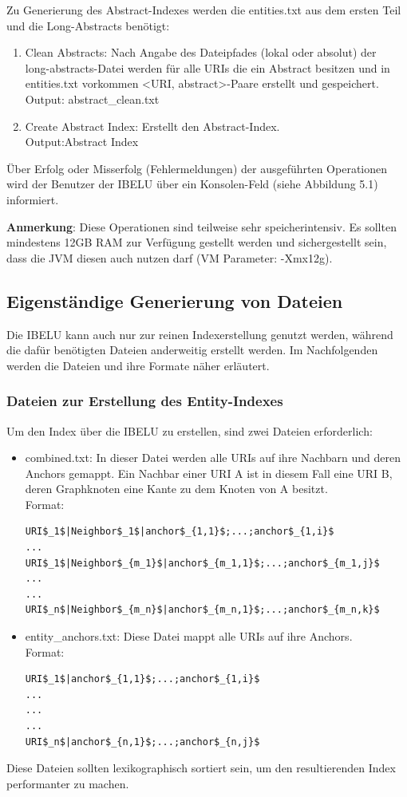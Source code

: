 \documentclass[11pt, a4paper, oneside]{Thesis} %
\begin{document}
Zu Generierung des Abstract-Indexes werden die entities.txt aus dem ersten Teil und die Long-Abstracts ben\"otigt:
\begin{enumerate}
\item Clean Abstracts: Nach Angabe des Dateipfades (lokal oder absolut) der\\ long-abstracts-Datei werden f\"ur alle URIs die ein Abstract besitzen und in entities.txt vorkommen \textless URI, abstract\textgreater-Paare erstellt und gespeichert.\\
Output: abstract\_clean.txt
\item Create Abstract Index: Erstellt den Abstract-Index.\\
Output:Abstract Index
\end{enumerate}
\"Uber Erfolg oder Misserfolg (Fehlermeldungen) der ausgef\"uhrten Operationen wird der Benutzer der IBELU \"uber ein Konsolen-Feld (siehe Abbildung 5.1) informiert.

\textbf{Anmerkung}: Diese Operationen sind teilweise sehr speicherintensiv. Es sollten mindestens 12GB RAM zur Verf\"ugung gestellt werden und sichergestellt sein, dass die JVM diesen auch nutzen darf (VM Parameter: -Xmx12g).


\subsection{Eigenst\"andige Generierung von Dateien}
Die IBELU kann auch nur zur reinen Indexerstellung genutzt werden, w\"ahrend die daf\"ur ben\"otigten Dateien anderweitig erstellt werden. Im Nachfolgenden werden die Dateien und ihre Formate n\"aher erl\"autert.
\subsubsection*{Dateien zur Erstellung des Entity-Indexes}
Um den Index \"uber die IBELU zu erstellen, sind zwei Dateien erforderlich:
\begin{itemize}
\item combined.txt: In dieser Datei werden alle URIs auf ihre Nachbarn und deren Anchors gemappt. Ein Nachbar einer URI A ist in diesem Fall eine URI B, deren Graphknoten eine Kante zu dem Knoten von A besitzt.\\
Format:
\begin{lstlisting}
URI$_1$|Neighbor$_1$|anchor$_{1,1}$;...;anchor$_{1,i}$
...
URI$_1$|Neighbor$_{m_1}$|anchor$_{m_1,1}$;...;anchor$_{m_1,j}$
...
...
URI$_n$|Neighbor$_{m_n}$|anchor$_{m_n,1}$;...;anchor$_{m_n,k}$
\end{lstlisting}
\item entity\_anchors.txt: Diese Datei mappt alle URIs auf ihre Anchors.\\
Format:
\begin{lstlisting}
URI$_1$|anchor$_{1,1}$;...;anchor$_{1,i}$
...
...
...
URI$_n$|anchor$_{n,1}$;...;anchor$_{n,j}$
\end{lstlisting} 
\end{itemize}
Diese Dateien sollten lexikographisch sortiert sein, um den resultierenden Index performanter zu machen.
\end{document}
